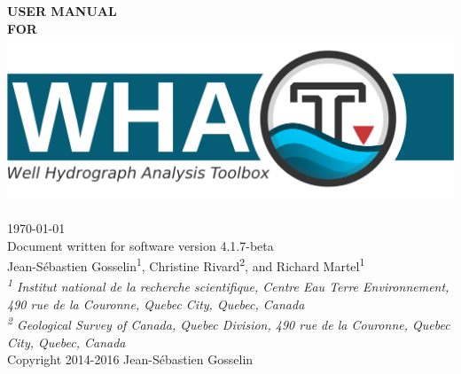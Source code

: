\documentclass[WHATMANUAL.tex]{subfiles}
\begin{document}

\textbf{\fontsize{72}{900}\selectfont \textcolor[HTML]{333333}{USER MANUAL}}\\[1.5cm]
\textbf{\fontsize{72}{900}\selectfont \textcolor[HTML]{333333}{FOR}}\\


\includegraphics[width=1\textwidth]{WHAT_banner}~\\[2cm]

{\Large \today}\\[0.5cm]
{\Large Document written for software version 4.1.7-beta}\\[2cm]

{\large Jean-S\'ebastien Gosselin\textsuperscript{1}, Christine Rivard\textsuperscript{2}, and Richard Martel\textsuperscript{1}}\\[0.25cm]

\textit{{\small\textsuperscript{1} Institut national de la recherche scientifique, Centre Eau Terre Environnement, 490 rue de la Couronne, Quebec City, Quebec, Canada}}\\[0.1cm]

\textit{{\small\textsuperscript{2} Geological Survey of Canada, Quebec Division, 490 rue de la Couronne, Quebec City, Quebec, Canada}}\\[2cm]

{Copyright 2014-2016 Jean-S\'ebastien Gosselin}
\end{document}
